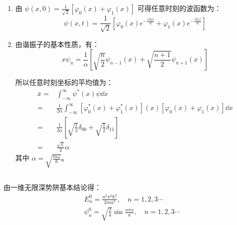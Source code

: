 \subsection{ }
\begin{enumerate}
\item 由 $\displaystyle \psi (x,0) = \frac{1}{\sqrt{2}}[\varphi_{0}(x) + \varphi_{1}(x)] $ 可得任意时刻的波函数为：\\
\begin{equation}
\psi(x,t) = \frac{1}{\sqrt{2}}\left[\varphi_{0}(x)e^{-\frac{iE_{0}t}{\hbar}} + \varphi_{1}(x)e^{-\frac{iE_{1}t}{\hbar}} \right]
\end{equation}

\item 由谐振子的基本性质，有：\\
\begin{equation}
x\psi_{n} = \frac{1}{\alpha} \left[\sqrt{\frac{n}{2}}\psi_{n-1}(x) + \sqrt{\frac{n+1}{2}}\psi_{n+1}(x) \right]
\end{equation}

所以任意时刻坐标的平均值为：\\
\begin{equation}
\begin{aligned}
\bar{x} =& \int^{\infty}_{-\infty} \psi^{*}(x)\psi \dd{x} \\
=& \frac{1}{2\alpha} \int^{\infty}_{-\infty} \left[\varphi^{*}_{0}(x)+\varphi^{*}_{1}(x)\right](x)\left[\varphi_{0}(x)+\varphi_{1}(x)\right] \dd{x} \\
=& \frac{1}{2\alpha} \left[\sqrt{\frac{1}{2}}\delta_{00}+\sqrt{\frac{1}{2}}\delta_{11} \right] \\
=& \frac{\sqrt{2}}{2} \alpha
\end{aligned}
\end{equation}
其中 $\displaystyle \alpha = \sqrt{\frac{m\omega}{\hbar}} $。
\end{enumerate}
\subsection{ }
由一维无限深势阱基本结论得：\\
\begin{equation}
\begin{aligned}
& E^{0}_{n} = \frac{n^{2} \pi^{2} \hbar^{2}}{2ma^{2}},\quad n = 1,2,3\cdots \\
& \psi^{0}_{n} = \sqrt{\frac{2}{a}} \sin{\frac{n \pi x}{a}},\quad n = 1,2,3\cdots
\end{aligned}
\end{equation}

